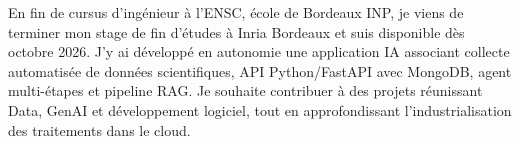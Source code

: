 
\begin{cvparagraph}
En fin de cursus d’ingénieur à l’ENSC, école de Bordeaux INP, je viens de terminer mon stage de fin d’études à Inria Bordeaux et suis disponible dès octobre 2026. J’y ai développé en autonomie une application IA associant collecte automatisée de données scientifiques, API Python/FastAPI avec MongoDB, agent multi-étapes et pipeline RAG. Je souhaite contribuer à des projets réunissant Data, GenAI et développement logiciel, tout en approfondissant l’industrialisation des traitements dans le cloud.
\end{cvparagraph}
